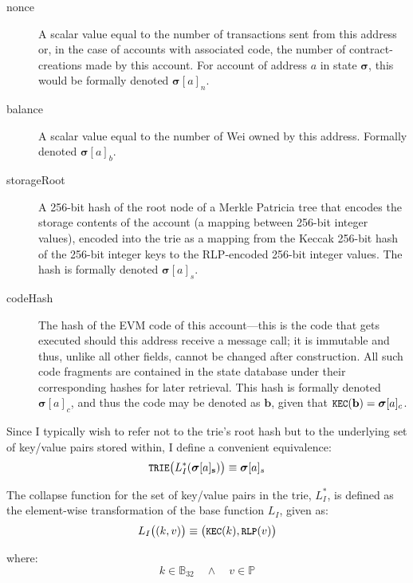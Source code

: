 \documentclass[9pt,oneside]{amsart}
\begin{document}
\begin{multicols}{2}
\begin{description}
\item[nonce] A scalar value equal to the number of transactions sent from this address or, in the case of accounts with associated code, the number of contract-creations made by this account. For account of address $a$ in state $\boldsymbol{\sigma}$, this would be formally denoted $\boldsymbol{\sigma}[a]_n$.
\item[balance] A scalar value equal to the number of Wei owned by this address. Formally denoted $\boldsymbol{\sigma}[a]_b$.
\item[storageRoot] A 256-bit hash of the root node of a Merkle Patricia tree that encodes the storage contents of the account (a mapping between 256-bit integer values), encoded into the trie as a mapping from the Keccak 256-bit hash of the  256-bit integer keys to the RLP-encoded 256-bit integer values. The hash is formally denoted $\boldsymbol{\sigma}[a]_s$.
\item[codeHash] The hash of the EVM code of this account---this is the code that gets executed should this address receive a message call; it is immutable and thus, unlike all other fields, cannot be changed after construction. All such code fragments are contained in the state database under their corresponding hashes for later retrieval. This hash is formally denoted $\boldsymbol{\sigma}[a]_c$, and thus the code may be denoted as $\mathbf{b}$, given that $\texttt{\small KEC}(\mathbf{b}) = \boldsymbol{\sigma}[a]_c$.
\end{description}

Since I typically wish to refer not to the trie's root hash but to the underlying set of key/value pairs stored within, I define a convenient equivalence:
\begin{equation}
\texttt{\small TRIE}\big(L_I^*(\boldsymbol{\sigma}[a]_\mathbf{s})\big) \equiv \boldsymbol{\sigma}[a]_s
\end{equation}

The collapse function for the set of key/value pairs in the trie, $L_I^*$, is defined as the element-wise transformation of the base function $L_I$, given as:
\begin{equation}
L_I\big( (k, v) \big) \equiv \big(\texttt{\small KEC}(k), \texttt{\small RLP}(v)\big)
\end{equation}

where:
\begin{equation}
k \in \mathbb{B}_{32} \quad \wedge \quad v \in \mathbb{P}
\end{equation}


\end{multicols}
\end{document}
